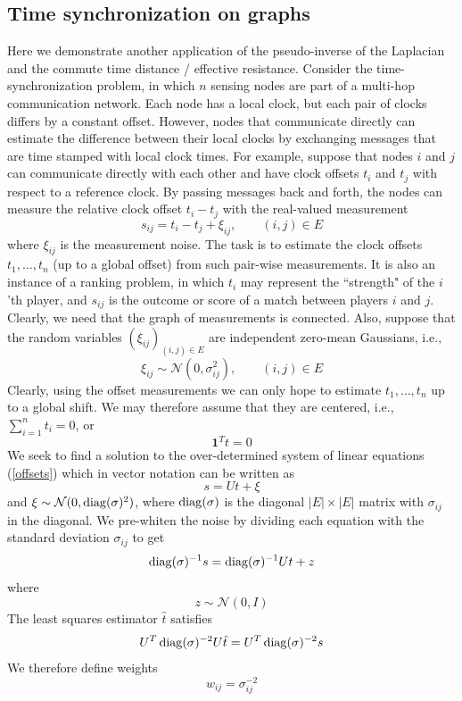 \subsection{Time synchronization on graphs}
Here we demonstrate another application of the pseudo-inverse of the Laplacian and the commute time distance / effective resistance.
Consider the time-synchronization problem, in which $n$ sensing nodes are part of a multi-hop
communication network. Each node has a local clock,
but each pair of clocks differs by a constant offset. However,
nodes that communicate directly can estimate the difference
between their local clocks by exchanging
messages that are time stamped with local clock times. For
example, suppose that nodes $i$ and $j$ can communicate
directly with each other and have clock offsets $t_i$ and $t_j$
with respect to a reference clock. By passing messages
back and forth, the nodes can measure the relative clock
offset $t_i-t_j$ with the real-valued measurement
\begin{equation}
\label{offsets}
s_{ij} = t_i - t_j + \xi_{ij},\qquad (i,j)\in E
\end{equation}
where $\xi_{ij}$ is the measurement noise. The task is to estimate the clock offsets $t_1,\ldots, t_n$ (up to a global offset) from such pair-wise measurements.
It is also an instance of a ranking problem, in which $t_i$ may represent the ``strength" of the $i$'th player, and $s_{ij}$ is the outcome or score of a match between players $i$ and $j$.
Clearly, we need that the graph of measurements is connected. Also, suppose that the random variables $(\xi_{ij})_{(i,j)\in E}$ are independent zero-mean Gaussians, i.e., $$\xi_{ij} \sim \mathcal{N}(0,\sigma_{ij}^2),\qquad (i,j)\in E$$ Clearly, using the offset measurements we can only hope to estimate $t_1,\ldots,t_n$ up to a global shift. We may therefore assume that they are centered, i.e., $\sum_{i=1}^n t_i = 0$, or
$${\mathbf 1}^T t = 0$$
We seek to find a solution to the over-determined system of linear equations (\ref{offsets}) which in vector notation can be written as 
$$s = Ut + \xi$$
and $\xi \sim \mathcal{N}(0,\operatorname{diag}(\sigma)^2)$, where $\operatorname{diag}(\sigma)$ is the diagonal $|E|\times |E|$ matrix with $\sigma_{ij}$ in the diagonal. We pre-whiten the noise by dividing each equation with the standard deviation $\sigma_{ij}$ to get
$$\operatorname{diag}(\sigma)^{-1} s = \operatorname{diag}(\sigma)^{-1} Ut + z$$
where $$z \sim \mathcal{N}(0,I)$$
The least squares estimator $\hat{t}$ satisfies 
$$U^T \operatorname{diag}(\sigma)^{-2} U\hat{t} = U^T \operatorname{diag}(\sigma)^{-2} s$$
We therefore define weights 
$$w_{ij} = \sigma_{ij}^{-2}$$
